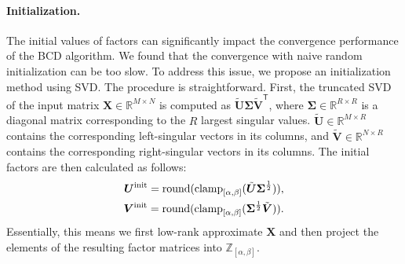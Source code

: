 


\paragraph{Initialization.}
The initial values of factors can significantly impact the convergence performance of the BCD algorithm. We found that the convergence with naive random initialization can be too slow. To address this issue, we propose an initialization method using SVD. The procedure is straightforward. First, the truncated SVD of the input matrix $\bm{X} \in \mathbb{R}^{M \times N}$ is computed as $\tilde{\bm{U}} \bm{\Sigma} \tilde{\bm{V}}^\mathsf{T}$, where $\bm{\Sigma} \in \mathbb{R}^{R \times R}$ is a diagonal matrix corresponding to the $R$ largest singular values. $\tilde{\bm{U}} \in \mathbb{R}^{M \times R}$ contains the corresponding left-singular vectors in its columns, and $\tilde{\bm{V}} \in \mathbb{R}^{N \times R}$ contains the corresponding right-singular vectors in its columns. The initial factors are then calculated as follows:
\begin{align} 
	\bm{U}^{\rm init} = \operatorname{round}(\operatorname{clamp}_{[\alpha,\beta]}(\tilde{\bm{U}} \bm{\Sigma}^\frac{1}{2})), \label{eq: initialization: u} \\
	\bm{V}^{\rm init} = \operatorname{round}(\operatorname{clamp}_{[\alpha,\beta]}(\bm{\Sigma}^\frac{1}{2} \tilde{\bm{V}})). \label{eq: initialization: v}
\end{align}
Essentially, this means we first low-rank approximate $\bm{X}$ and then project the elements of the resulting factor matrices into $\mathbb{Z}_{[\alpha,\beta]}$. 

